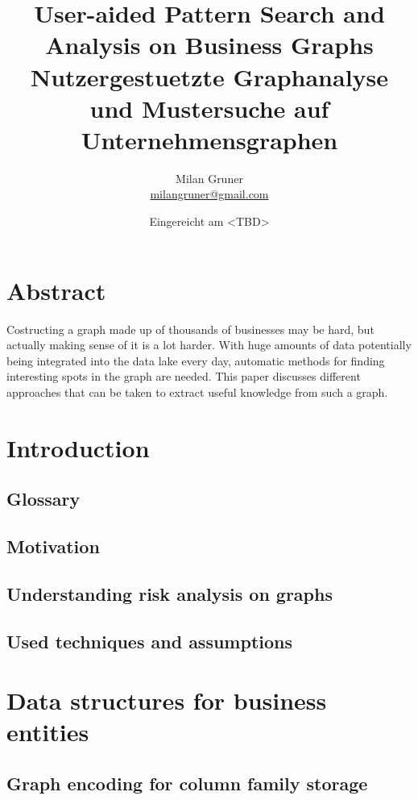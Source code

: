\documentclass[
        a4paper,     %
        titlepage,   %
        twoside,     %
        parskip      %
        ]{scrartcl}  %
\title{
  User-aided Pattern Search and Analysis on Business Graphs
  \\ \bigskip
  \large{Nutzergestuetzte Graphanalyse und Mustersuche auf Unternehmensgraphen}
}
\author{Milan Gruner\\{\small{\url{milangruner@gmail.com}}}}
\date{Eingereicht am <TBD>}
\begin{document}
  \maketitle    %
  \clearpage %

  \section*{Abstract}
  { \huge
    Costructing a graph made up of thousands of businesses may be hard, but actually making sense of it is a lot harder.
    With huge amounts of data potentially being integrated into the data lake every day, automatic methods for finding interesting spots in the graph are needed.
    This paper discusses different approaches that can be taken to extract useful knowledge from such a graph.
  }

  \clearpage
  \tableofcontents


  \section{Introduction}
    \subsection{Glossary}
    \subsection{Motivation}
    \subsection{Understanding risk analysis on graphs}
    \subsection{Used techniques and assumptions}
    \pagebreak

  \section{Data structures for business entities}
    \subsection{Graph encoding for column family storage}
\end{document}
